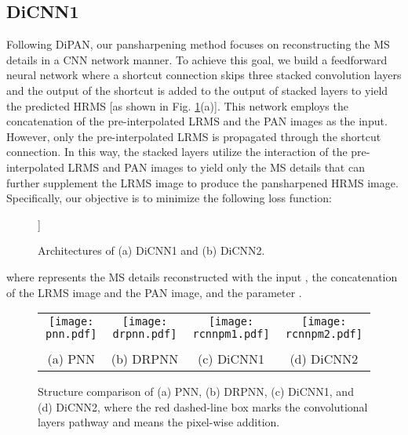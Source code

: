 \documentclass[journal]{IEEEtran}
\begin{document}
\subsection{DiCNN1}
Following DiPAN, our pansharpening method focuses on reconstructing the MS details in a CNN network manner. To achieve this goal, we build a feedforward neural network where a shortcut connection skips three stacked convolution layers and the output of the shortcut is added to the output of stacked layers to yield the predicted HRMS [as shown in Fig. \ref{fig:NetStructure}(a)]. This network employs the concatenation of the pre-interpolated LRMS and the PAN images as the input. However, only the pre-interpolated LRMS is propagated through the shortcut connection. In this way, the stacked layers utilize the interaction of the pre-interpolated LRMS and PAN images to yield only the MS details  that can further supplement the LRMS image to produce the pansharpened HRMS image. Specifically, our objective is to minimize the following loss function:

\begin{figure}[ht]
\centering
{}
\-1pt]

\caption{Architectures of (a) DiCNN1 and (b) DiCNN2.}
\label{fig:NetStructure}
\end{figure}


where  represents the MS details reconstructed with the input , the concatenation of the LRMS image and the PAN image, and the parameter .

\begin{figure*}[ht]\scriptsize
\centering
  \begin{tabular}{cccc}
   \texttt{[image: pnn.pdf]} &
   \texttt{[image: drpnn.pdf]} &
  \texttt{[image: rcnnpm1.pdf]}  &
  \texttt{[image: rcnnpm2.pdf]}\\
\\
 (a) PNN	&  (b) DRPNN & (c) DiCNN1 & (d) DiCNN2\\
  \end{tabular}
\caption{Structure comparison of (a) PNN, (b) DRPNN, (c) DiCNN1, and (d) DiCNN2, where the red dashed-line box marks the convolutional layers pathway and  means the pixel-wise addition.}
\label{fig:StructComp}
\end{figure*}
\end{document}
